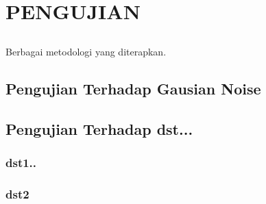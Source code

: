 \chapter{PENGUJIAN}
\label{sec:chap4_pengujian}
\vspace{1ex}

\section*{}
Berbagai metodologi yang diterapkan.
\section{Pengujian Terhadap Gausian Noise}
\lipsum[1]
\section{Pengujian Terhadap dst...}
\subsection{dst1..}
\lipsum[2]
\subsection{dst2}
\lipsum[3]

